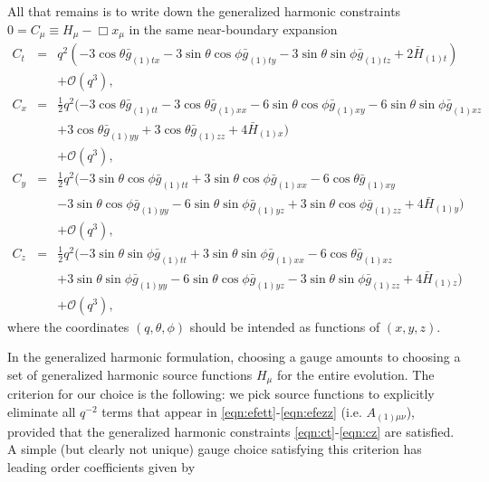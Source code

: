 \documentclass[a4paper,11pt]{article}
\begin{document}
All that remains is to write down the generalized harmonic constraints $0=C_\mu \equiv H_\mu-\Box x_\mu$ in the same near-boundary expansion
\begin{eqnarray}\label{eqn:ct}
C_t&=&q^2 (-3 \cos \theta  \bar{g}_{(1)tx}-3 \sin \theta  \cos \phi  \bar{g}_{(1)ty}-3 \sin \theta  \sin \phi \bar{g}_{(1)tz}+2
   \bar{H}_{(1) t}) \nonumber \\
   &&+\mathcal{O}(q^3),\\
%
\label{eqn:cx}
C_x&=&\frac{1}{2} q^2 (-3 \cos \theta  \bar{g}_{(1)tt}-3 \cos \theta  \bar{g}_{(1)xx}-6 \sin \theta  \cos \phi  \bar{g}_{(1)xy}-6 \sin
   \theta  \sin \phi  \bar{g}_{(1)xz} \nonumber \\
  &&+3 \cos \theta  \bar{g}_{(1)yy}+3
   \cos \theta  \bar{g}_{(1)zz}+4 \bar{H}_{(1) x}) \nonumber \\
   &&+\mathcal{O}(q^3),\\
%
\label{eqn:cy}
C_y&=&\frac{1}{2} q^2 (-3 \sin \theta  \cos \phi  \bar{g}_{(1)tt}+3 \sin
   \theta  \cos \phi  \bar{g}_{(1)xx}-6 \cos \theta  \bar{g}_{(1)xy} \nonumber \\
   &&-3
   \sin \theta  \cos \phi  \bar{g}_{(1) yy}-6 \sin \theta  \sin \phi
   \bar{g}_{(1)yz}+3 \sin \theta  \cos \phi  \bar{g}_{(1)zz}+4
   \bar{H}_{(1) y}) \nonumber \\
   &&+\mathcal{O}(q^3),\\
%
\label{eqn:cz}
C_z&=&\frac{1}{2} q^2 (-3 \sin \theta \sin \phi  \bar{g}_{(1)tt}+3 \sin
   \theta \sin \phi \bar{g}_{(1)xx}-6 \cos \theta  \bar{g}_{(1)xz} \nonumber \\
   &&+3
   \sin \theta \sin \phi  \bar{g}_{(1)yy}-6 \sin \theta  \cos \phi    \bar{g}_{(1)yz}-3 \sin \theta  \sin \phi  \bar{g}_{(1)zz}+4
   \bar{H}_{(1)z}) \nonumber \\
   &&+\mathcal{O}(q^3),
\end{eqnarray}
where the coordinates $(q,\theta,\phi)$ should be intended as functions of $(x,y,z)$.

In the generalized harmonic formulation, choosing a gauge amounts to choosing a set of generalized harmonic source functions $H_\mu$ for the entire evolution.
The criterion for our choice is the following: we pick source functions to explicitly eliminate all $q^{-2}$ terms that appear in \eqref{eqn:efett}-\eqref{eqn:efezz} (i.e. $A_{(1)\mu\nu}$), provided that the generalized harmonic constraints \eqref{eqn:ct}-\eqref{eqn:cz} are satisfied.
A simple (but clearly not unique) gauge choice satisfying this criterion has leading order coefficients given by
\end{document}
